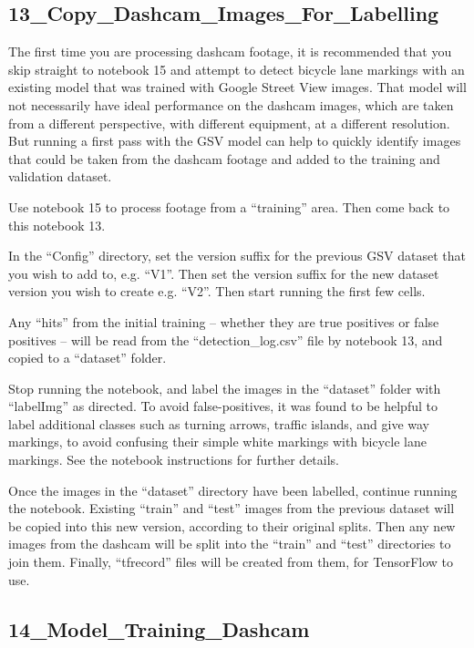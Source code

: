 \documentclass[11pt,twoside]{report}
\begin{document}
\subsection{13\_Copy\_Dashcam\_Images\_For\_Labelling}
\label{a13}

The first time you are processing dashcam footage, it is recommended that you skip straight to notebook 15 and attempt to detect bicycle lane markings with an existing model that was trained with Google Street View images.  That model will not necessarily have ideal performance on the dashcam images, which are taken from a different perspective, with different equipment, at a different resolution.  But running a first pass with the GSV model can help to quickly identify images that could be taken from the dashcam footage and added to the training and validation dataset.

Use notebook 15 to process footage from a ``training'' area.  Then come back to this notebook 13.

In the ``Config'' directory, set the version suffix for the previous GSV dataset that you wish to add to, e.g. ``V1''.  Then set the version suffix for the new dataset version you wish to create e.g. ``V2''.  Then start running the first few cells.

Any ``hits'' from the initial training -- whether they are true positives or false positives -- will be read from the ``detection\_log.csv'' file by notebook 13, and copied to a ``dataset'' folder.

Stop running the notebook, and label the images in the ``dataset'' folder with ``labelImg'' as directed.  To avoid false-positives, it was found to be helpful to label additional classes such as turning arrows, traffic islands, and give way markings, to avoid confusing their simple white markings with bicycle lane markings.  See the notebook instructions for further details.

Once the images in the ``dataset'' directory have been labelled, continue running the notebook.  Existing ``train'' and ``test'' images from the previous dataset will be copied into this new version, according to their original splits.  Then any new images from the dashcam will be split into the ``train'' and ``test'' directories to join them.  Finally, ``tfrecord'' files will be created from them, for TensorFlow to use.


\subsection{14\_Model\_Training\_Dashcam}
\label{a14}
\end{document}

